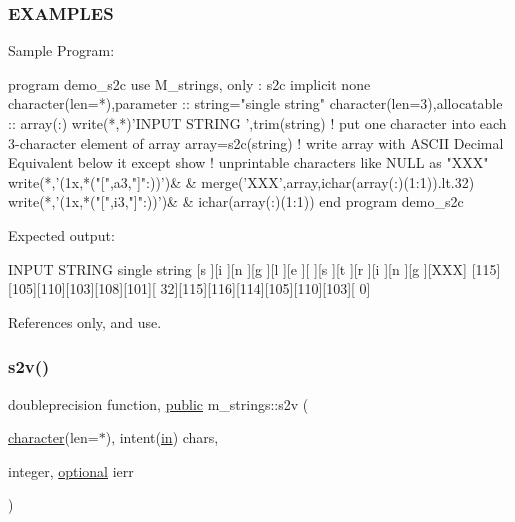 \subsubsection*{E\+X\+A\+M\+P\+L\+ES}

\begin{DoxyVerb}Sample Program:

 program demo_s2c
 use M_strings, only : s2c
 implicit none
 character(len=*),parameter   :: string="single string"
 character(len=3),allocatable :: array(:)
    write(*,*)'INPUT STRING ',trim(string)
    ! put one character into each 3-character element of array
    array=s2c(string)
    ! write array with ASCII Decimal Equivalent below it except show
    ! unprintable characters like NULL as "XXX"
    write(*,'(1x,*("[",a3,"]":))')&
         & merge('XXX',array,ichar(array(:)(1:1)).lt.32)
    write(*,'(1x,*("[",i3,"]":))')&
         & ichar(array(:)(1:1))
 end program demo_s2c
\end{DoxyVerb}


Expected output\+:

I\+N\+P\+UT S\+T\+R\+I\+NG single string \mbox{[}s \mbox{]}\mbox{[}i \mbox{]}\mbox{[}n \mbox{]}\mbox{[}g \mbox{]}\mbox{[}l \mbox{]}\mbox{[}e \mbox{]}\mbox{[} \mbox{]}\mbox{[}s \mbox{]}\mbox{[}t \mbox{]}\mbox{[}r \mbox{]}\mbox{[}i \mbox{]}\mbox{[}n \mbox{]}\mbox{[}g \mbox{]}\mbox{[}X\+XX\mbox{]} \mbox{[}115\mbox{]}\mbox{[}105\mbox{]}\mbox{[}110\mbox{]}\mbox{[}103\mbox{]}\mbox{[}108\mbox{]}\mbox{[}101\mbox{]}\mbox{[} 32\mbox{]}\mbox{[}115\mbox{]}\mbox{[}116\mbox{]}\mbox{[}114\mbox{]}\mbox{[}105\mbox{]}\mbox{[}110\mbox{]}\mbox{[}103\mbox{]}\mbox{[} 0\mbox{]} 

References only, and use.

\mbox{\label{namespacem__strings_a7b153720f1f9b93c49094dcb1272995b}} 
\subsubsection{\texorpdfstring{s2v()}{s2v()}}
{\footnotesize\ttfamily doubleprecision function, \hyperlink{M__stopwatch_83_8txt_a2f74811300c361e53b430611a7d1769f}{public} m\+\_\+strings\+::s2v (\begin{DoxyParamCaption}\item[{\hyperlink{option__stopwatch_83_8txt_abd4b21fbbd175834027b5224bfe97e66}{character}(len=$\ast$), intent(\hyperlink{M__journal_83_8txt_afce72651d1eed785a2132bee863b2f38}{in})}]{chars,  }\item[{integer, \hyperlink{option__stopwatch_83_8txt_aa4ece75e7acf58a4843f70fe18c3ade5}{optional}}]{ierr }\end{DoxyParamCaption})}



